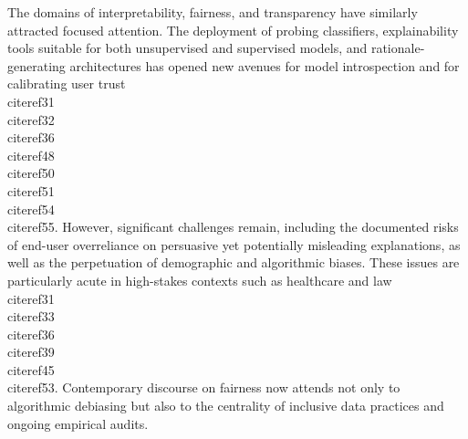 \documentclass[11pt]{article}
\begin{document}
The domains of interpretability, fairness, and transparency have similarly attracted focused attention. The deployment of probing classifiers, explainability tools suitable for both unsupervised and supervised models, and rationale-generating architectures has opened new avenues for model introspection and for calibrating user trust~\\cite{ref31}\\cite{ref32}\\cite{ref36}\\cite{ref48}\\cite{ref50}\\cite{ref51}\\cite{ref54}\\cite{ref55}. However, significant challenges remain, including the documented risks of end-user overreliance on persuasive yet potentially misleading explanations, as well as the perpetuation of demographic and algorithmic biases. These issues are particularly acute in high-stakes contexts such as healthcare and law~\\cite{ref31}\\cite{ref33}\\cite{ref36}\\cite{ref39}\\cite{ref45}\\cite{ref53}. Contemporary discourse on fairness now attends not only to algorithmic debiasing but also to the centrality of inclusive data practices and ongoing empirical audits.
\end{document}
